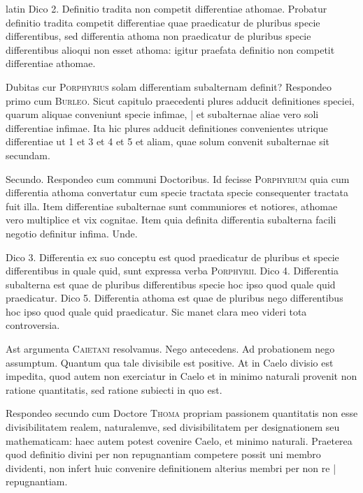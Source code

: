 \begin{otherlanguage*}{latin}
\pstart
 Dico 2. Definitio tradita non competit differentiae athomae. Probatur definitio tradita competit differentiae quae praedicatur de pluribus specie differentibus, sed differentia athoma non praedicatur de pluribus specie differentibus alioqui non esset athoma: igitur praefata definitio non competit differentiae athomae. 
\pend

\pstart
 Dubitas cur \textsc{Porphyrius} solam differentiam subalternam definit? Respondeo primo cum \textsc{Burleo}.  Sicut capitulo praecedenti plures adducit definitiones speciei, quarum aliquae conveniunt specie infimae, \textnormal{|} et subalternae aliae vero soli differentiae infimae. Ita hic plures adducit definitiones convenientes utrique differentiae ut 1 et 3 et 4 et 5 et aliam, quae solum convenit subalternae sit secundam. 
\pend

\pstart
 Secundo. Respondeo cum communi Doctoribus. Id fecisse \textsc{Porphyrium} quia cum differentia athoma convertatur cum specie tractata specie consequenter tractata fuit illa. Item differentiae subalternae sunt communiores et notiores, athomae vero multiplice et vix cognitae. Item quia definita differentia subalterna facili negotio definitur infima. Unde. 
\pend

\pstart
 Dico 3. Differentia ex suo conceptu est quod praedicatur de pluribus et specie differentibus in quale quid, sunt expressa verba \textsc{Porphyrii}. Dico 4. Differentia subalterna est quae de pluribus differentibus specie hoc ipso quod quale quid praedicatur. Dico 5. Differentia athoma est quae de pluribus nego differentibus hoc ipso quod quale quid praedicatur. Sic manet clara meo videri tota controversia. 
\pend

\pstart
 Ast argumenta \textsc{Caietani} resolvamus. Nego antecedens. Ad probationem nego assumptum. Quantum qua tale divisibile est positive. At in Caelo divisio est impedita, quod autem non exerciatur in Caelo et in minimo naturali provenit non ratione quantitatis, sed ratione subiecti in quo est. 
\pend

\pstart
 Respondeo secundo cum Doctore \textsc{Thoma} propriam passionem quantitatis non esse divisibilitatem realem, naturalemve, sed divisibilitatem per designationem seu mathematicam: haec autem potest covenire Caelo, et minimo naturali. Praeterea quod definitio divini per non repugnantiam competere possit uni membro dividenti, non infert huic convenire definitionem alterius membri per non re \textnormal{|}    repugnantiam. 
\pend


\end{otherlanguage*}
